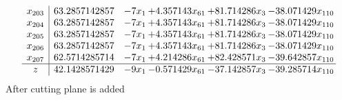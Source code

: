 \documentclass[11pt]{article}
\begin{document}
\[\begin{array}{c| c c@{\hskip 2pt} c@{\hskip 2pt} c@{\hskip 2pt} c@{\hskip 2pt} }
 x_{203}   &  63.2857142857 & -7 x_{1} & + 4.357143 x_{61} & + 81.714286 x_{3} & -38.071429 x_{110}\\
 x_{204}   &  63.2857142857 & -7 x_{1} & + 4.357143 x_{61} & + 81.714286 x_{3} & -38.071429 x_{110}\\
 x_{205}   &  63.2857142857 & -7 x_{1} & + 4.357143 x_{61} & + 81.714286 x_{3} & -38.071429 x_{110}\\
 x_{206}   &  63.2857142857 & -7 x_{1} & + 4.357143 x_{61} & + 81.714286 x_{3} & -38.071429 x_{110}\\
 x_{207}   &  62.5714285714 & -7 x_{1} & + 4.214286 x_{61} & + 82.428571 x_{3} & -39.642857 x_{110}\\
\hline
z    &  42.1428571429 & -9 x_{1} & -0.571429 x_{61} & -37.142857 x_{3} & -39.285714 x_{110}\\
\end{array}\]
 After cutting plane is added 
\end{document}
